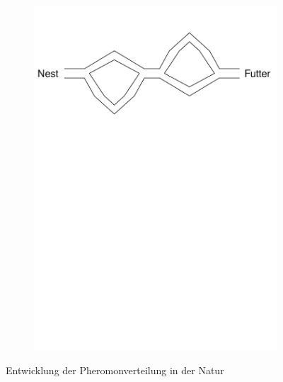 \documentclass[pdftex,
               12pt,
               DIV=12,
               a4paper,
               twoside,
               parskip=half,
               abstract=true,
               dvipsnames]{scrartcl}
\begin{document}
\begin{figure}[h]
\begin{subfigure}{0.45\textwidth}
		\includegraphics[width=\linewidth, page=4]{aco_biology}
		\caption{} \label{subfig:ACO_biologie_c}
	\end{subfigure}
	\caption{Entwicklung der Pheromonverteilung in der Natur \cite[vgl.][]{Engelbrecht07}}
\end{figure}
\end{document}
